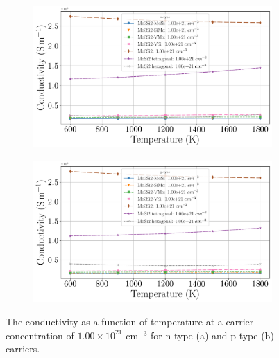 \documentclass[7.5pt]{article}
\theoremstyle{plain}
\theoremstyle{definition}
\newcommand{\<}{\langle}
\renewcommand{\>}{\rangle}
\begin{document}
\begin{figure}[b!]
\centering
\begin{subfigure}{.5\textwidth}
  \centering
  \includegraphics[width=\linewidth]{allmats_C_temp_doping_n}
  \caption{}
  \label{fig:sub1}
\end{subfigure}%
\begin{subfigure}{.5\textwidth}
  \centering
  \includegraphics[width=\linewidth]{allmats_C_temp_doping_p}
  \caption{}
  \label{fig:sub2}
\end{subfigure}
\caption{The conductivity as a function of temperature at a carrier concentration of $1.00 \times 10^{21}$ cm$^{-3}$ for n-type (a) and p-type (b) carriers.}
\label{fig:C-Temp}
\end{figure}
\end{document}
